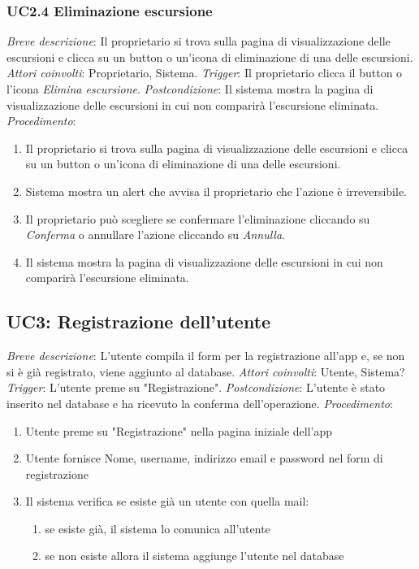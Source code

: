\subsubsection{UC2.4 Eliminazione escursione}

\noindent \emph{Breve descrizione}: Il proprietario si trova sulla pagina di visualizzazione delle escursioni e clicca su un button o un'icona di eliminazione di una delle escursioni.\medbreak
\noindent \emph{Attori coinvolti}: Proprietario, Sistema.\medbreak
\noindent \emph{Trigger}: Il proprietario clicca il button o l'icona \textit{Elimina escursione}.\medbreak
\noindent \emph{Postcondizione}: Il sistema mostra la pagina di visualizzazione delle escursioni in cui non comparirà l'escursione eliminata.\medbreak
\noindent \emph{Procedimento}:

\begin{enumerate}
    \item Il proprietario si trova sulla pagina di visualizzazione delle escursioni e clicca su un button o un'icona di eliminazione di una delle escursioni.
    \item Sistema mostra un alert che avvisa il proprietario che l'azione è irreversibile.
    \item Il proprietario può scegliere se confermare l'eliminazione cliccando su \textit{Conferma} o annullare l'azione cliccando su \textit{Annulla}.
    \item Il sistema mostra la pagina di visualizzazione delle escursioni in cui non comparirà l'escursione eliminata.
\end{enumerate}

\subsection{UC3: Registrazione dell'utente}
\noindent \emph{Breve descrizione}: L'utente compila il form per la registrazione all'app e, se non si è già registrato, viene aggiunto al database.\medbreak
\noindent \emph{Attori coinvolti}: Utente, Sistema?\medbreak
\noindent \emph{Trigger}: L'utente preme su "Registrazione".\medbreak
\noindent \emph{Postcondizione}: L'utente è stato inserito nel database e ha ricevuto la conferma dell'operazione.\medbreak
\noindent \emph{Procedimento}:
\begin{enumerate}
    \item Utente preme su "Registrazione" nella pagina iniziale dell'app
    \item Utente fornisce Nome, username, indirizzo email e password nel form di registrazione
    \item Il sistema verifica se esiste già un utente con quella mail:
          \begin{enumerate}
              \item se esiste già, il sistema lo comunica all'utente
              \item se non esiste allora il sistema aggiunge l'utente nel database
          \end{enumerate}
\end{enumerate}

